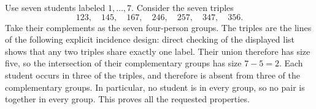 Use seven students labeled $1,\ldots,7$. Consider the seven triples
\[
123,\quad145,\quad167,\quad246,\quad257,\quad347,\quad356.
\]
Take their complements as the seven four-person groups. The triples are the lines of the following explicit incidence design: direct checking of the displayed list shows that any two triples share exactly one label. Their union therefore has size five, so the intersection of their complementary groups has size $7-5=2$.
Each student occurs in three of the triples, and therefore is absent from three of the complementary groups. In particular, no student is in every group, so no pair is together in every group. This proves all the requested properties.
